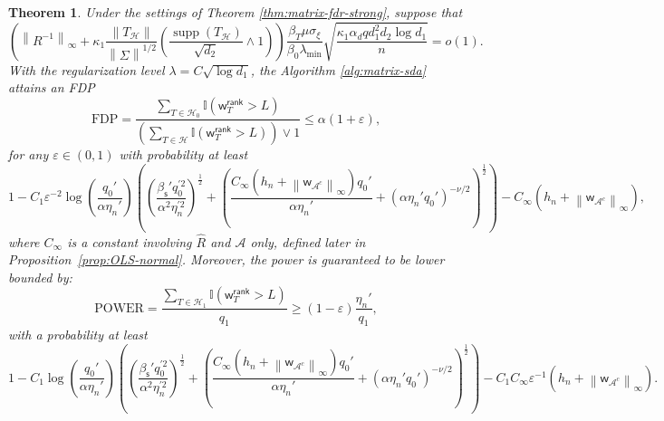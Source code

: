 \documentclass[12pt]{article}
\newcommand{\norm}[1]{\left\lVert#1\right\rVert}
\newcommand{\cH}{\mathcal{H}}
\newcommand{\bbI}{\mathbb{I}}
\def\wt{\widehat}
\def\sfw{\mathsf{w}}
\def\calA{{\mathcal A}}
\def\calH{{\mathcal H}}
\newtheorem{Theorem}{Theorem}
\theoremstyle{plain}
\begin{document}
\begin{Theorem}
Under the settings of Theorem \ref{thm:matrix-fdr-strong}, suppose that
\begin{equation*}
    \left(\norm{R^{-1}  }_\infty +\kappa_1 \frac{\norm{T_{\calH} } }{\norm{ \Sigma }^{1/2}}\left( \frac{\operatorname{supp}(T_{\calH} )}{\sqrt{d_2}}\wedge 1 \right)  \right)\frac{\beta_T \mu \sigma_\xi }{\beta_0 \lambda_{\min} }\sqrt{\frac{\kappa_1\alpha_d q d_1^2 d_2 \log d_1 }{n}}=o(1).
\end{equation*}
With the regularization level $\lambda=C\sqrt{\log d_1}$, the Algorithm \ref{alg:matrix-sda} attains an FDP 
\begin{equation*}
     \mathrm{FDP}=\frac{\sum_{T\in \cH_0  } \bbI(\sfw_{T}^{\mathsf{rank}} >L ) }{\left( \sum_{T\in \cH  } \bbI(\sfw_T^{\mathsf{rank}} >L ) \right) \vee 1 } \le \alpha(1+\varepsilon),
\end{equation*}
for any $\varepsilon\in(0,1)$ with probability at least 
\begin{equation*}
    1-C_1\varepsilon^{-2}\log(\frac{ q_{0}' }{\alpha \eta_n'})\left( \left(\frac{\beta_{\mathsf{s}}'  q_{0}^{'2} }{ \alpha^2\eta_n^{'2}}\right)^{\frac{1}{2}} + \left(\frac{C_\infty \left( h_n+\norm{ \sfw_{\calA^c} }_{\infty} \right)  q_{0}' }{\alpha \eta_n'} +(\alpha\eta_n'  q_{0}')^{-\nu/2} \right)^{\frac{1}{2}}\right)- C_\infty  \left( h_n+\norm{ \sfw_{\calA^c} }_{\infty} \right),
\end{equation*}
where $C_\infty$ is a constant involving $\wt R$ and $\calA$ only, defined later in Proposition~\ref{prop:OLS-normal}. Moreover, the power is guaranteed to be lower bounded by:
\begin{equation*}
   \mathrm{POWER}= \frac{\sum_{T\in \cH_1  } \bbI(\sfw_T^{\mathsf{rank}} >L ) }{q_1} \ge (1-\varepsilon)\frac{\eta_n' }{q_1},
\end{equation*}
with a probability at least
\begin{equation*}
  1-C_1 \log(\frac{ q_{0}' }{\alpha \eta_n'})\left( \left(\frac{\beta_{\mathsf{s}}'  q_{0}^{'2} }{ \alpha^2\eta_n^{'2}}\right)^{\frac{1}{2}} + \left(\frac{C_\infty  \left( h_n+\norm{ \sfw_{\calA^c} }_{\infty} \right)  q_{0}'}{\alpha \eta_n'}+(\alpha\eta_n'  q_{0}')^{-\nu/2} \right)^{\frac{1}{2}}\right)- C_1 C_\infty  \varepsilon^{-1} \left( h_n+\norm{ \sfw_{\calA^c} }_{\infty} \right).
\end{equation*}
\end{Theorem}
\end{document}
